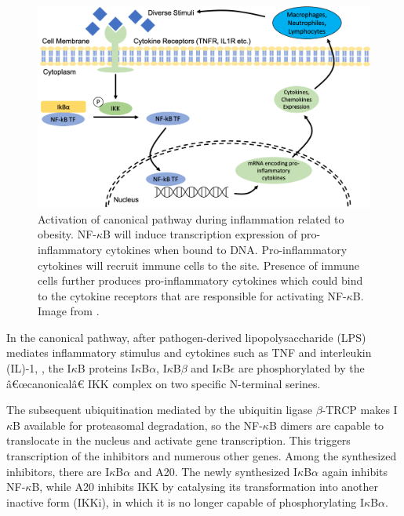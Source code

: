 \documentclass[12pt,a4paper]{report}
\begin{document}
\begin{figure}[!ht]
\includegraphics[scale=0.45]{NFkBmechanism.png}
\caption{Activation of canonical pathway during inflammation related to obesity. NF-$\kappa$B will induce transcription expression of pro-inflammatory cytokines when bound to DNA. Pro-inflammatory cytokines will recruit immune cells to the site. Presence of immune cells further produces pro-inflammatory cytokines which could bind to the cytokine receptors that are responsible for activating NF-$\kappa$B. Image from \cite{Project}.}
\label{NFkBmechanism}
\end{figure}
\newpage
In the canonical pathway, after pathogen-derived lipopolysaccharide (LPS) mediates inflammatory stimulus and cytokines such as TNF and interleukin (IL)-1, , the I$\kappa$B proteins I$\kappa$B$\alpha$, I$\kappa$B$\beta$ and I$\kappa$B$\epsilon$ are phosphorylated by the â€œcanonicalâ€ IKK complex on two specific N-terminal serines.

The subsequent ubiquitination mediated by the ubiquitin ligase $\beta$-TRCP makes I$\kappa$B available for
proteasomal degradation, so the NF-$\kappa$B dimers are capable to translocate in the nucleus and
activate gene transcription. This triggers transcription of the inhibitors and numerous other genes. Among the synthesized inhibitors, there are I$\kappa$B$\alpha$ and A20. The newly synthesized I$\kappa$B$\alpha$ again inhibits NF-$\kappa$B, while A20 inhibits IKK by catalysing its transformation into another inactive form (IKKi), in which it is no longer capable of phosphorylating I$\kappa$B$\alpha$.
\end{document}
